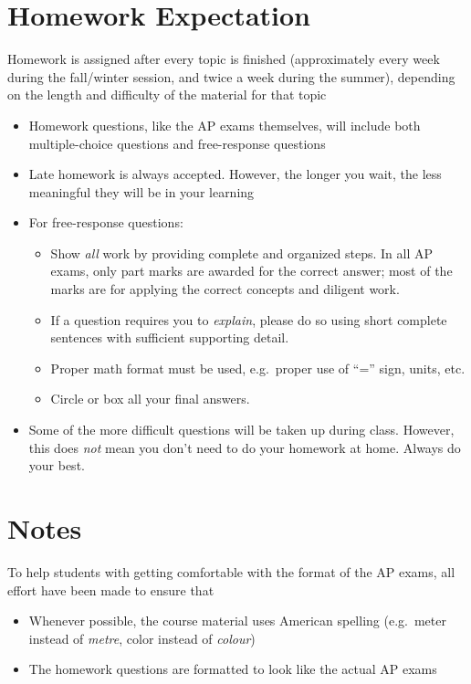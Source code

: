 \documentclass{../../oss-handout}
\begin{document}
\section*{Homework Expectation}
Homework is assigned after every topic is finished (approximately every
week during the fall/winter session, and twice a week during the summer),
depending on the length and difficulty of the material for that topic
\begin{itemize}[nosep]
\item Homework questions, like the AP exams themselves, will include both
  multiple-choice questions and free-response questions
\item Late homework is always accepted. However, the longer you wait, the less
  meaningful they will be in your learning
\item For free-response questions:
  \begin{itemize}[nosep]
  \item Show \emph{all} work by providing complete and organized steps. In all
    AP exams, only part marks are awarded for the correct answer; most of the
    marks are for applying the correct concepts and diligent work.
  \item If a question requires you to \emph{explain}, please do so using
    short complete sentences with sufficient supporting detail.
  \item Proper math format must be used, e.g.\ proper use of ``='' sign, units,
    etc.
  \item Circle or box all your final answers.
  \end{itemize}
\item Some of the more difficult questions will be taken up during class.
  However, this does \emph{not} mean you don't need to do your homework at
  home. Always do your best.
\end{itemize}


\section*{Notes}
To help students with getting comfortable with the format of the AP exams, all
effort have been made to ensure that
\begin{itemize}[nosep]
\item Whenever possible, the course material uses American spelling (e.g.\
  meter instead of \emph{metre}, color instead of \emph{colour})
\item The homework questions are formatted to look like the actual AP exams
\end{itemize}
\end{document}
